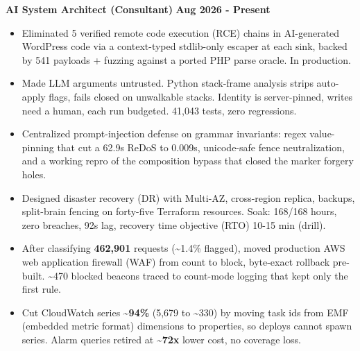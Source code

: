 \documentclass[10pt,a4paper]{article}
\newcommand{\tld}{\textasciitilde{}}%
\newcommand{\dates}[1]{\hfill {\bfseries #1}}
\begin{document}
{\bfseries AI System Architect (Consultant)} \dates{Aug 2026 - Present}
\begin{itemize}
  \item Eliminated 5 verified remote code execution (RCE) chains in AI-generated WordPress code via a
  context-typed \mbox{stdlib-only} escaper at each sink, backed by 541 payloads + fuzzing against a
  ported PHP parse oracle. In production.
  \item Made LLM arguments untrusted. Python stack-frame analysis strips auto-apply flags,
  fails closed on unwalkable stacks. Identity is server-pinned, writes need a
  human, each run budgeted. 41,043 tests, zero regressions.
  \item Centralized prompt-injection defense on grammar invariants: regex value-pinning that cut a
  62.9s ReDoS to 0.009s, unicode-safe fence neutralization, and a working repro of the composition
  bypass that closed the marker forgery holes.
  \item Designed disaster recovery (DR) with Multi-AZ, cross-region replica, backups,
  \mbox{split-brain} fencing on \mbox{forty-five} Terraform resources. Soak: 168/168 hours,
  zero breaches, 92s lag, recovery time objective (RTO) 10-15 min (drill).
  \item After classifying \textbf{462,901} requests (\tld{}1.4\% flagged), moved production
  AWS web application firewall (WAF) from count to block, \mbox{byte-exact} rollback pre-built.
  \tld{}470 blocked beacons traced to count-mode logging that kept only the first rule.
  \item Cut CloudWatch series \textbf{\tld{}94\%} (5,679 to \tld{}330) by moving task ids from
  EMF (embedded metric format) dimensions to properties, so deploys cannot spawn series.
  Alarm queries retired at \textbf{\tld{}72x} lower cost, no coverage loss.
\end{itemize}
\end{document}
